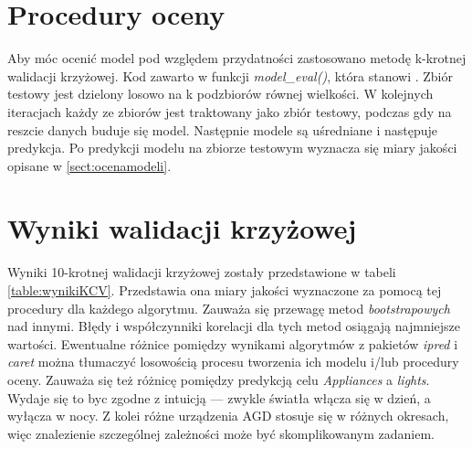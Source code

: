 \documentclass[a4paper,11pt,twoside]{mwrep}  %
\begin{document}
\section{Procedury oceny}\label{sect:proceduryOceny}
Aby móc ocenić model pod względem przydatności zastosowano metodę k-krotnej walidacji krzyżowej. Kod zawarto w funkcji \textit{model\_eval()}, która stanowi . Zbiór testowy jest dzielony losowo na k podzbiorów równej wielkości. W kolejnych iteracjach każdy ze zbiorów jest traktowany jako zbiór testowy, podczas gdy na reszcie danych buduje się model. Następnie modele są uśredniane i następuje predykcja. Po predykcji modelu na zbiorze testowym wyznacza się miary jakości opisane w \ref{sect:ocenamodeli}.      

\section{Wyniki walidacji krzyżowej}\label{sect:wyniki}
Wyniki 10-krotnej walidacji krzyżowej zostały przedstawione w tabeli \ref{table:wynikiKCV}. Przedstawia ona miary jakości wyznaczone za pomocą tej procedury dla każdego algorytmu. Zauważa się przewagę metod \textit{bootstrapowych} nad innymi. Błędy i współczynniki korelacji dla tych metod osiągają najmniejsze wartości. Ewentualne różnice pomiędzy wynikami algorytmów z pakietów \textit{ipred} i \textit{caret} można tłumaczyć losowością procesu tworzenia ich modelu i/lub procedury oceny. Zauważa się też różnicę pomiędzy predykcją celu \textit{Appliances} a \textit{lights}. Wydaje się to byc zgodne z intuicją --- zwykle światła włącza się w dzień, a wyłącza w nocy. Z kolei różne urządzenia AGD stosuje się w różnych okresach, więc znalezienie szczególnej zależności może być skomplikowanym zadaniem.   
\end{document}
